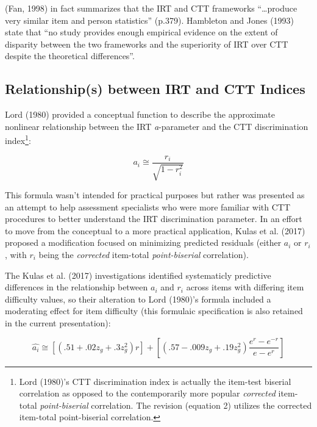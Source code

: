 \documentclass[
  man]{apa6}
\begin{document}
(Fan, 1998) in fact summarizes that the IRT and CTT frameworks ``\ldots produce very similar item and person statistics'' (p.379). Hambleton and Jones (1993) state that ``no study provides enough empirical evidence on the extent of disparity between the two frameworks and the superiority of IRT over CTT despite the theoretical differences''.

\hypertarget{relationships-between-irt-and-ctt-indices}{%
\subsection{Relationship(s) between IRT and CTT Indices}\label{relationships-between-irt-and-ctt-indices}}

Lord (1980) provided a conceptual function to describe the approximate nonlinear relationship between the IRT \emph{a}-parameter and the CTT discrimination index\footnote{Lord (1980)'s CTT discrimination index is actually the item-test biserial correlation as opposed to the contemporarily more popular \emph{corrected} item-total \emph{point-biserial} correlation. The revision (equation 2) utilizes the corrected item-total point-biserial correlation.}:

\begin{equation}
a_i\cong \frac{r_i}{\sqrt{1-r_i^2}}
\end{equation}

This formula wasn't intended for practical purposes but rather was presented as an attempt to help assessment specialists who were more familiar with CTT procedures to better understand the IRT discrimination parameter. In an effort to move from the conceptual to a more practical application, Kulas et al. (2017) proposed a modification focused on minimizing predicted residuals (either \(a_i\) or \(r_i\), with \(r_i\) being the \emph{corrected} item-total \emph{point-biserial} correlation).

The Kulas et al. (2017) investigations identified systematicly predictive differences in the relationship between \(a_i\) and \(r_i\) across items with differing item difficulty values, so their alteration to Lord (1980)'s formula included a moderating effect for item difficulty (this formulaic specification is also retained in the current presentation):

\begin{equation}
\hat{a_i}\cong[(.51 + .02z_g + .3z_g^2)r]+[(.57 - .009z_g + .19z_g^2)\frac{e^r-e^{-r}}{e-e^r}]
\end{equation}
\end{document}
